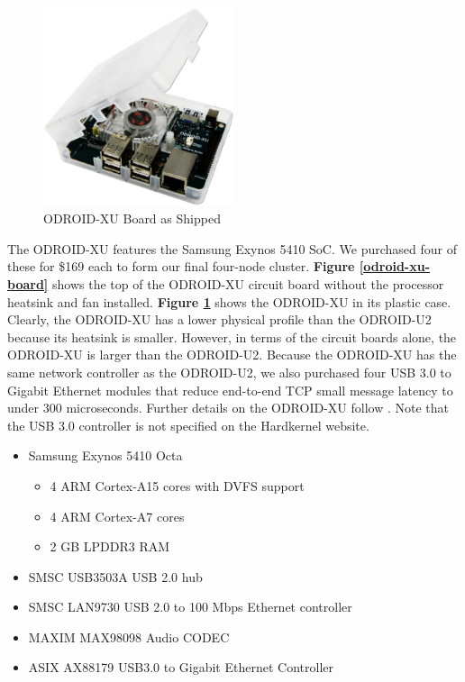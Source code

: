 \documentclass[11pt]{book}
\begin{document}
\begin{figure}[h]
\centering
\includegraphics[width=0.5\textwidth]{odroid_xu}
\caption{ODROID-XU Board as Shipped \cite{odroid-xu-board-detail}}
\label{odroid-xu}
\end{figure}

The ODROID-XU features the Samsung Exynos 5410 SoC. We purchased four of these
for \$169 each to form our final four-node cluster. \textbf{Figure
  \ref{odroid-xu-board}} shows the top of the ODROID-XU circuit board without
the processor heatsink and fan installed. \textbf{Figure \ref{odroid-xu}} shows
the ODROID-XU in its plastic case. Clearly, the ODROID-XU has a lower physical
profile than the ODROID-U2 because its heatsink is smaller. However, in terms of
the circuit boards alone, the ODROID-XU is larger than the ODROID-U2. Because
the ODROID-XU has the same network controller as the ODROID-U2, we also
purchased four USB 3.0 to Gigabit Ethernet modules that reduce end-to-end TCP
small message latency to under 300 microseconds. Further details on the
ODROID-XU follow \cite{odroid-xu-board-detail}. Note that the USB 3.0 controller
is not specified on the Hardkernel website.

\begin{itemize}
\item Samsung Exynos 5410 Octa
  \begin{itemize}
  \item 4 ARM Cortex-A15 cores with DVFS support
  \item 4 ARM Cortex-A7 cores
  \item 2 GB LPDDR3 RAM
  \end{itemize}
\item SMSC USB3503A USB 2.0 hub
\item SMSC LAN9730 USB 2.0 to 100 Mbps Ethernet controller
\item MAXIM MAX98098 Audio CODEC
\item ASIX AX88179 USB3.0 to Gigabit Ethernet Controller
\end{itemize}
\end{document}
